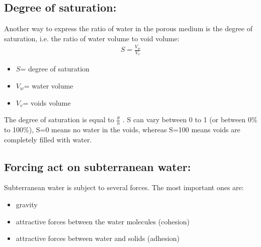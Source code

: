 \documentclass[letterpaper,10pt,english]{sphinxmanual}
\let\sphinxpxdimen\pdfpxdimen\else\newdimen\sphinxpxdimen
\begin{document}
\subsection{Degree of saturation:}
\label{\detokenize{contents/flow/12_subsurface_structure:degree-of-saturation}}
Another way to express the ratio of water in the porous medium is the degree of saturation, i.e. the ratio of water volume to void volume:
\begin{equation*}
\begin{split}{S}=\frac{V_{w}}{V_{v}}\end{split}
\end{equation*}\begin{itemize}
\item {} 
\({S}\)= degree of saturation

\item {} 
\({V_{w}}\)= water volume

\item {} 
\({V_{v}}\)= voids volume

\end{itemize}

The degree of saturation is equal to \(\frac{θ}{n}\) . S can vary between 0 to 1 (or between 0\% to 100\%), S=0 means no water in the voids, whereas S=100 means voids are completely filled with water.



\subsection{Forcing act on subterranean water:}
\label{\detokenize{contents/flow/12_subsurface_structure:forcing-act-on-subterranean-water}}
Subterranean water is subject to several forces. The most important ones are:
\begin{itemize}
\item {} 
gravity

\item {} 
attractive forces between the water molecules (cohesion)

\item {} 
attractive forces between water and solids (adhesion)

\end{itemize}

\noindent{\hspace*{\fill}\sphinxincludegraphics[height=250\sphinxpxdimen]{{L02_fig11}.png}\hspace*{\fill}}
\end{document}
